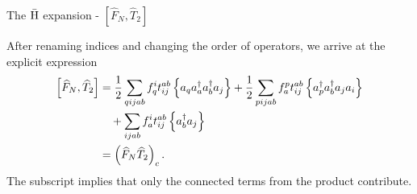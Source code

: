 \begin{frame}{The $\bar{\mathrm{H}}$ expansion - $\left[ \hat{F}_N, \hat{T}_2 \right]$}

    After renaming indices and changing the order of operators, we arrive at the explicit expression
    \begin{align*}
        \left[ \widehat{F}_N, \widehat{T}_2 \right]
        &= \frac{1}{2} \sum_{qijab} f_q^i t_{ij}^{ab} \left\{a_q a^\dagger_a a^\dagger_b a_j\right\}
        + \frac{1}{2} \sum_{pijab} f_a^p t_{ij}^{ab} \left\{a^\dagger_p a^\dagger_b a_j a_i\right\} \\
        & \quad + \sum_{ijab} f_a^i t_{ij}^{ab} \left\{a^\dagger_b a_j\right\} \\
    &= \left( \widehat{F}_N \widehat{T}_2\right)_c.
    \end{align*}
    The subscript implies that only the connected terms from the product contribute.

\end{frame}

    
